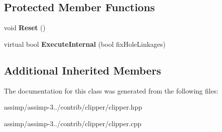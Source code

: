 \subsection*{Protected Member Functions}
\begin{DoxyCompactItemize}
\item 
\hypertarget{class_clipper_lib_1_1_clipper_a14c704b062e8a079e34a8ce40838861e}{void {\bfseries Reset} ()}\label{class_clipper_lib_1_1_clipper_a14c704b062e8a079e34a8ce40838861e}

\item 
\hypertarget{class_clipper_lib_1_1_clipper_ae5842758f1dd90b023f569489b78e320}{virtual bool {\bfseries Execute\+Internal} (bool fix\+Hole\+Linkages)}\label{class_clipper_lib_1_1_clipper_ae5842758f1dd90b023f569489b78e320}

\end{DoxyCompactItemize}
\subsection*{Additional Inherited Members}


The documentation for this class was generated from the following files\+:\begin{DoxyCompactItemize}
\item 
assimp/assimp-\/3../contrib/clipper/clipper.\+hpp\item 
assimp/assimp-\/3../contrib/clipper/clipper.\+cpp\end{DoxyCompactItemize}
